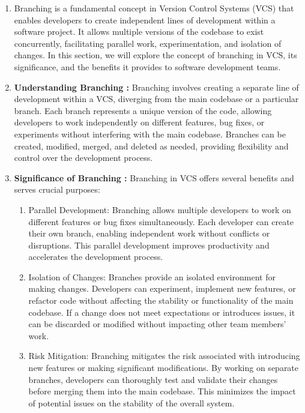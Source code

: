 \begin{enumerate}
    \item Branching is a fundamental concept in Version Control Systems (VCS) that enables developers to create independent lines of development within a software project. It allows multiple versions of the codebase to exist concurrently, facilitating parallel work, experimentation, and isolation of changes. In this section, we will explore the concept of branching in VCS, its significance, and the benefits it provides to software development teams.
    \item \textbf{Understanding Branching : }Branching involves creating a separate line of development within a VCS, diverging from the main codebase or a particular branch. Each branch represents a unique version of the code, allowing developers to work independently on different features, bug fixes, or experiments without interfering with the main codebase. Branches can be created, modified, merged, and deleted as needed, providing flexibility and control over the development process.
    \item \textbf{Significance of Branching : }Branching in VCS offers several benefits and serves crucial purposes:
    \begin{enumerate}
        \item Parallel Development: Branching allows multiple developers to work on different features or bug fixes simultaneously. Each developer can create their own branch, enabling independent work without conflicts or disruptions. This parallel development improves productivity and accelerates the development process.

        \item Isolation of Changes: Branches provide an isolated environment for making changes. Developers can experiment, implement new features, or refactor code without affecting the stability or functionality of the main codebase. If a change does not meet expectations or introduces issues, it can be discarded or modified without impacting other team members' work.

        \item Risk Mitigation: Branching mitigates the risk associated with introducing new features or making significant modifications. By working on separate branches, developers can thoroughly test and validate their changes before merging them into the main codebase. This minimizes the impact of potential issues on the stability of the overall system.


\end{enumerate}
\end{enumerate}

